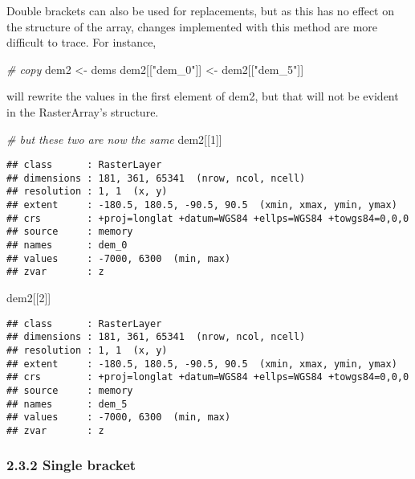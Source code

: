 \documentclass[]{article}
\newenvironment{Shaded}{\begin{snugshade}}{\end{snugshade}}
\newcommand{\CommentTok}[1]{\textcolor[rgb]{0.56,0.35,0.01}{\textit{#1}}}
\newcommand{\DecValTok}[1]{\textcolor[rgb]{0.00,0.00,0.81}{#1}}
\newcommand{\NormalTok}[1]{#1}
\newcommand{\StringTok}[1]{\textcolor[rgb]{0.31,0.60,0.02}{#1}}
\begin{document}
Double brackets can also be used for replacements, but as this has no
effect on the structure of the array, changes implemented with this
method are more difficult to trace. For instance,

\begin{Shaded}
\begin{Highlighting}[]
\CommentTok{# copy}
\NormalTok{dem2 <-}\StringTok{ }\NormalTok{dems}
\NormalTok{dem2[[}\StringTok{"dem_0"}\NormalTok{]] <-}\StringTok{ }\NormalTok{dem2[[}\StringTok{"dem_5"}\NormalTok{]]}
\end{Highlighting}
\end{Shaded}

will rewrite the values in the first element of dem2, but that will not
be evident in the RasterArray's structure.

\begin{Shaded}
\begin{Highlighting}[]
\CommentTok{# but these two are now the same}
\NormalTok{dem2[[}\DecValTok{1}\NormalTok{]]}
\end{Highlighting}
\end{Shaded}

\begin{verbatim}
## class      : RasterLayer 
## dimensions : 181, 361, 65341  (nrow, ncol, ncell)
## resolution : 1, 1  (x, y)
## extent     : -180.5, 180.5, -90.5, 90.5  (xmin, xmax, ymin, ymax)
## crs        : +proj=longlat +datum=WGS84 +ellps=WGS84 +towgs84=0,0,0 
## source     : memory
## names      : dem_0 
## values     : -7000, 6300  (min, max)
## zvar       : z
\end{verbatim}

\begin{Shaded}
\begin{Highlighting}[]
\NormalTok{dem2[[}\DecValTok{2}\NormalTok{]]}
\end{Highlighting}
\end{Shaded}

\begin{verbatim}
## class      : RasterLayer 
## dimensions : 181, 361, 65341  (nrow, ncol, ncell)
## resolution : 1, 1  (x, y)
## extent     : -180.5, 180.5, -90.5, 90.5  (xmin, xmax, ymin, ymax)
## crs        : +proj=longlat +datum=WGS84 +ellps=WGS84 +towgs84=0,0,0 
## source     : memory
## names      : dem_5 
## values     : -7000, 6300  (min, max)
## zvar       : z
\end{verbatim}

\hypertarget{single-bracket}{%
\subsubsection{2.3.2 Single bracket}\label{single-bracket}}
\end{document}
